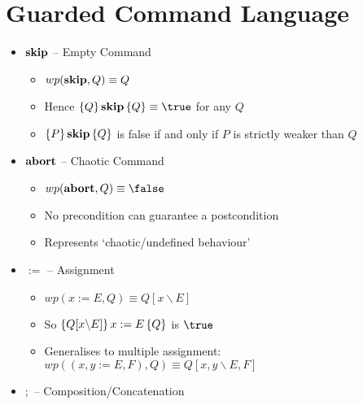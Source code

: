 \section{Guarded Command Language}

\begin{itemize}
	
	\item $ {\bf skip} $ -- Empty Command
	
	\begin{itemize}
		
		\item $ wp({\bf skip}, Q) \equiv Q $
		
		\item Hence $ \hoare{Q}{\Skip}{Q} \equiv \true $ for any $ Q $
		
		\item $ \left\lbrace P \right\rbrace {\bf skip} \left\lbrace Q \right\rbrace $ is false if and only if $ P $ is strictly weaker than $ Q $
		
	\end{itemize}

	\item $ {\bf abort} $ -- Chaotic Command
	
	\begin{itemize}
		
		\item $ wp(\Abort, Q) \equiv \false $
		
		\item No precondition can guarantee a postcondition
		
		\item Represents `chaotic/undefined behaviour'
		
	\end{itemize}
	
	\item $ := $ -- Assignment
	
	\begin{itemize}
		
		\item $ wp(x := E, Q) \equiv Q[x \backslash E] $
		
		\item So $ \left\lbrace Q[x \backslash E] \right\rbrace x := E \left\lbrace Q \right\rbrace $ is $ \true $
		
		\item Generalises to multiple assignment: $ wp((x,y := E, F), Q) \equiv Q[x,y \backslash E,F] $
		
	\end{itemize}
	
	\item $ ; $ -- Composition/Concatenation
	

\end{itemize}
